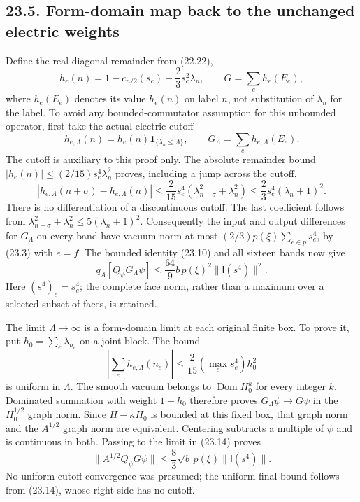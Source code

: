 \documentclass[
]{article}
\begin{document}
\subsection{23.5. Form-domain map back to the unchanged electric
weights}\label{form-domain-map-back-to-the-unchanged-electric-weights}

Define the real diagonal remainder from (22.22), \[
h_e(n)=1-c_{n/2}(s_e)-\frac23s_e^2\lambda_n,\qquad
G=\sum_eh_e(E_e),
\] where \(h_e(E_e)\) denotes its value \(h_e(n)\) on label \(n\), not
substitution of \(\lambda_n\) for the label. To avoid any
bounded-commutator assumption for this unbounded operator, first take
the actual electric cutoff \[
h_{e,\Lambda}(n)=h_e(n)\mathbf1_{\{\lambda_n\le\Lambda\}},
\qquad G_\Lambda=\sum_eh_{e,\Lambda}(E_e).
\] The cutoff is auxiliary to this proof only. The absolute remainder
bound \(|h_e(n)|\le(2/15)s_e^4\lambda_n^2\) proves, including a jump
across the cutoff, \[
|h_{e,\Lambda}(n+\sigma)-h_{e,\Lambda}(n)|
 \le\frac{2}{15}s_e^4(\lambda_{n+\sigma}^2+\lambda_n^2)
 \le\frac23s_e^4(\lambda_n+1)^2 .
\tag{23.13}
\] There is no differentiation of a discontinuous cutoff. The last
coefficient follows from \(\lambda_{n+\sigma}^2+\lambda_n^2
\le5(\lambda_n+1)^2\). Consequently the input and output differences for
\(G_\Lambda\) on every band have vacuum norm at most
\((2/3)p(\xi)\sum_{e\in p}s_e^4\), by (23.3) with \(e=f\). The bounded
identity (23.10) and all sixteen bands now give \[
q_A[Q_\psi G_\Lambda\psi]
 \le\frac{64}{9}b\,p(\xi)^2\|\mathsf I(s^4)\|^2 .
\tag{23.14}
\] Here \((s^4)_e=s_e^4\); the complete face norm, rather than a maximum
over a selected subset of faces, is retained.

The limit \(\Lambda\to\infty\) is a form-domain limit at each original
finite box. To prove it, put \(h_0=\sum_e\lambda_{n_e}\) on a joint
block. The bound \[
\left|\sum_e h_{e,\Lambda}(n_e)\right|
\le\frac{2}{15}\left(\max_e s_e^4\right)h_0^2
\] is uniform in \(\Lambda\). The smooth vacuum belongs to
\(\operatorname{Dom}H_0^k\) for every integer \(k\). Dominated summation
with weight \(1+h_0\) therefore proves \(G_\Lambda\psi\to G\psi\) in the
\(H_0^{1/2}\) graph norm. Since \(H-\kappa H_0\) is bounded at this
fixed box, that graph norm and the \(A^{1/2}\) graph norm are
equivalent. Centering subtracts a multiple of \(\psi\) and is continuous
in both. Passing to the limit in (23.14) proves \[
\|A^{1/2}Q_\psi G\psi\|
 \le\frac83\sqrt b\,p(\xi)\|\mathsf I(s^4)\|.
\tag{23.15}
\] No uniform cutoff convergence was presumed; the uniform final bound
follows from (23.14), whose right side has no cutoff.
\end{document}
